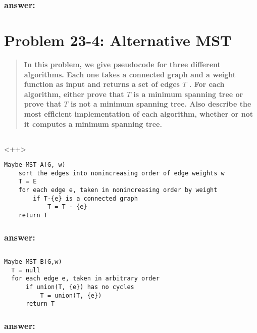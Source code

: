 \documentclass[titlepage]{article}\usepackage[]{graphicx}\usepackage[]{color}
\begin{document}
\subsubsection{answer:}
\vspace{8cm}



\section{Problem 23-4: Alternative MST}
\begin{quote}
  \textbf{ In this problem, we give pseudocode for three different algorithms.
	Each one takes a connected graph and a weight function as input and returns
	a set of edges $T$ .  For each algorithm, either prove that $T$ is a
	minimum spanning tree or prove that $T$ is not a minimum spanning tree.
	Also describe the most efﬁcient implementation of each algorithm, whether or
	not it computes a minimum spanning tree.  }
\end{quote}

\subsection{}<++>
\begin{lstlisting}
Maybe-MST-A(G, w)
	sort the edges into nonincreasing order of edge weights w
	T = E
	for each edge e, taken in nonincreasing order by weight
		if T-{e} is a connected graph
			T = T - {e}
	return T
\end{lstlisting}
\subsubsection{answer: }
\vspace{8cm}




\subsection{}
\begin{lstlisting}
Maybe-MST-B(G,w)
  T = null
  for each edge e, taken in arbitrary order
	  if union(T, {e}) has no cycles
		  T = union(T, {e})
	  return T
\end{lstlisting}
\subsubsection{answer: }

\vspace{8cm}
\end{document}
